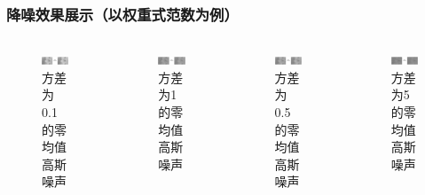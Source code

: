 \documentclass[10pt,aspectratio=43,mathserif]{beamer}
\begin{document}
\begin{frame}
\frametitle{\textbf{降噪效果展示（以权重式范数为例）}}
\begin{columns}
\begin{figure}
\centering
\includegraphics[scale=0.25]{Screenshot_1.png}
\caption{方差为0.1的零均值高斯噪声}
\end{figure}

\begin{figure}
\centering
\includegraphics[scale=0.25]{Screenshot_3.png}
\caption{方差为1的零均值高斯噪声}
\end{figure}

\begin{figure}
\centering
\includegraphics[scale=0.25]{Screenshot_2.png}
\caption{方差为0.5的零均值高斯噪声}
\end{figure}

\begin{figure}
\centering
\includegraphics[scale=0.25]{Screenshot_4.png}
\caption{方差为5的零均值高斯噪声}
\end{figure}


\end{columns}
\end{frame}
\end{document}
